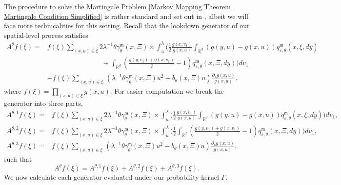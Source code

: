\documentclass[12pt]{article}
\def \bar{\overline}
\begin{document}
The procedure to solve the Martingale Problem \eqref{Markov Mapping Theorem Martingale Condition Simplified} is rather standard and set out in \cite{kurtz/rodrigues:2011}, albeit we will face more technicalities for this setting. Recall that the lookdown generator of our spatial-level process satisfies
\begin{align}\label{Lookdown generator N lambda theta prelimit}
A^{\theta}f(\xi)=&f(\xi)\sum_{(x,u)\in\xi}2\lambda^{-1}\theta\gamma^{\mathfrak{m}}_{\theta}(x,\Xi)\times
\int_u^{
\lambda}\Bigg(\frac 12\frac{g(x,v_1)}{g(x,u)}\int_{\mathbb{R}^d} (g(y,u)-g(x,u))q^{\mathfrak{m}}_{\varepsilon,\theta}(x,\bar{
\xi },dy) \nonumber \\
& \qquad \qquad \qquad \qquad +\int_{\mathbb{R}^d} \left(\frac{g(y,v_1)+g(x,v_1)}{2}-1\right)q^{\mathfrak{m}}_{\varepsilon,\theta}(x,\Xi,dy)\Bigg)dv_1 \nonumber\\
&+f(\xi )\sum_{(x,u)\in\xi}\,\left(\lambda^{-1} \theta \gamma^{\mathfrak{m}}_{\theta}(x,\Xi) u^2 -b_{\theta}(x,\Xi)u\right)\frac {\partial_u g(x,u)}{g(x,u)},
\end{align}
where $f(\xi) =\prod_{(x,u) \in \xi}g(x,u)$. 
For easier computation we break the generator into three parts, 
\begin{equation}
\begin{aligned}
A^{\theta,1}f(\xi)=&f(\xi)\sum_{(x,u)\in\xi}2\lambda^{-1}\theta\gamma^{\mathfrak{m}}_{\theta}(x,\Xi)\times
\int_u^{
\lambda}\Bigg(\frac 12\frac{g(x,v_1)}{g(x,u)}\int_{\mathbb{R}^d} (g(y,u)-g(x,u))q^{\mathfrak{m}}_{\varepsilon,\theta}(x,\bar{
\xi },dy)\Bigg)dv_1,\\
A^{\theta,2}f(\xi)=&f(\xi)\sum_{(x,u)\in\xi}2\lambda^{-1}\theta\gamma^{\mathfrak{m}}_{\theta}(x,\Xi)\times
\int_u^{
\lambda}\Bigg(\frac{1}{2}\int_{\mathbb{R}^d} \left(\frac{g(y,v_1)+g(x,v_1)}{2}-1\right)q^{\mathfrak{m}}_{\varepsilon,\theta}(x,\Xi,dy)\Bigg)dv_1,\\
A^{\theta,3}f(\xi)=&f(\xi )\sum_{(x,u)\in\xi}\,\left(\lambda^{-1} \theta \gamma^{\mathfrak{m}}_{\theta}(x,\Xi) u^2 -b_{\theta}(x,\Xi)u\right)\frac {\partial_u g(x,u)}{g(x,u)},
\end{aligned}
\end{equation}
such that 
$$A^{\theta}f(\xi)=A^{\theta,1}f(\xi)+A^{\theta,2}f(\xi)+A^{\theta,3}f(\xi).$$
We now calculate each generator evaluated under our probability kernel $\Gamma$.
\footnotesize 
\end{document}
